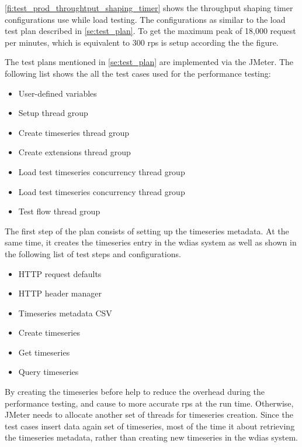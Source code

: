 \cref{fi:test_prod_throughtput_shaping_timer} shows the throughput shaping timer configurations use while load testing. The configurations as similar to the load test plan described in \cref{se:test_plan}. To get the maximum peak of 18,000 request per minutes, which is equivalent to 300 \acrshort{rps} is setup according the the figure.

The test plans mentioned in \cref{se:test_plan} are implemented via the  JMeter. The following list shows the all the test cases used for the performance testing:

\begin{itemize}
    \item User-defined variables
    \item Setup thread group
    \item Create timeseries thread group
    \item Create extensions thread group
    \item Load test timeseries concurrency thread group
    \item Load test timeseries concurrency thread group
    \item Test flow thread group
\end{itemize}

The first step of the plan consists of setting up the timeseries metadata. At the same time, it creates the timeseries entry in the \acrshort{wdias} system as well as shown in the following list of test steps and configurations.

\begin{itemize}
    \item HTTP request defaults
    \item HTTP header manager
    \item Timeseries metadata CSV
    \item Create timeseries
    \item Get timeseries
    \item Query timeseries
\end{itemize}

By creating the timeseries before help to reduce the overhead during the performance testing, and cause to more accurate \acrshort{rps} at the run time.
Otherwise,  JMeter needs to allocate another set of threads for timeseries creation. Since the test cases insert data again set of timeseries, most of the time it about retrieving the timeseries metadata, rather than creating new timeseries in the \acrshort{wdias} system.


